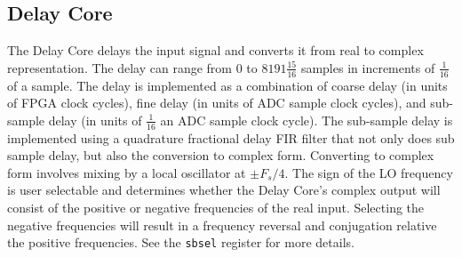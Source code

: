 \documentclass[12pt]{article}
\begin{document}
  \subsection{Delay Core}

The Delay Core delays the input signal and converts it from real to complex
representation.  The delay can range from $0$ to $8191\frac{15}{16}$ samples in
increments of $\frac{1}{16}$ of a sample.  The delay is implemented as a
combination of coarse delay (in units of FPGA clock cycles), fine delay (in
units of ADC sample clock cycles), and sub-sample delay (in units of
$\frac{1}{16}$ an ADC sample clock cycle).  The sub-sample delay is implemented
using a quadrature fractional delay FIR filter that not only does sub sample
delay, but also the conversion to complex form.  Converting to complex form
involves mixing by a local oscillator at $\pm F_s/4$.  The sign of the LO
frequency is user selectable and determines whether the Delay Core's complex
output will consist of the positive or negative frequencies of the real input.
Selecting the negative frequencies will result in a frequency reversal and
conjugation relative the positive frequencies.  See the \verb|sbsel| register
for more details.
\end{document}
